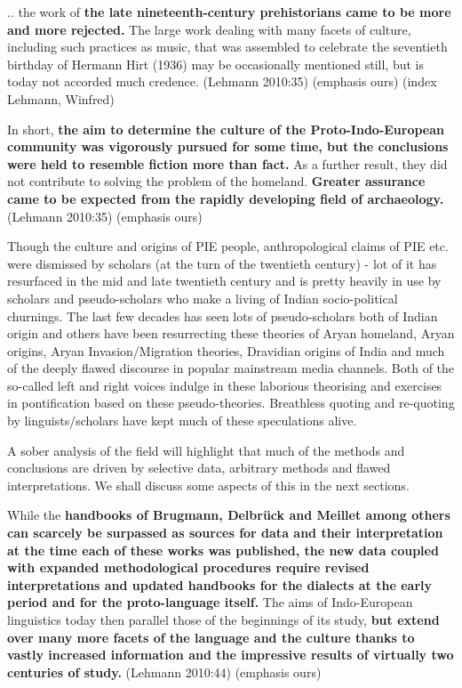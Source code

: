 \begin{myquote}
.. the work of \textbf{the late nineteenth-century prehistorians came to be more and more rejected.} The large work dealing with many facets of culture, including such practices as music, that was assembled to celebrate the seventieth birthday of Hermann Hirt (1936) may be occasionally mentioned still, but is today not accorded much credence. (Lehmann 2010:35) (emphasis ours) (index Lehmann, Winfred)
\end{myquote}

\begin{myquote}
In short, \textbf{the aim to determine the culture of the Proto-Indo-European community was vigorously pursued for some time, but the conclusions were held to resemble fiction more than fact.} As a further result, they did not contribute to solving the problem of the homeland. \textbf{Greater assurance came to be expected from the rapidly developing field of archaeology.} (Lehmann 2010:35) (emphasis ours)
\end{myquote}

Though the culture and origins of PIE people, anthropological claims of PIE etc. were dismissed by scholars (at the turn of the twentieth century) - lot of it has resurfaced in the mid and late twentieth century and is pretty heavily in use by scholars and pseudo-scholars who make a living of Indian socio-political churnings. The last few decades has seen lots of pseudo-scholars both of Indian origin and others have been resurrecting these theories of Aryan homeland, Aryan origins, Aryan Invasion/Migration theories, Dravidian origins of India and much of the deeply flawed discourse in popular mainstream media channels. Both of the so-called left and right voices indulge in these laborious theorising and exercises in pontification based on these pseudo-theories. Breathless quoting and re-quoting by linguists/scholars have kept much of these speculations alive.

A sober analysis of the field will highlight that much of the methods and conclusions are driven by selective data, arbitrary methods and flawed interpretations. We shall discuss some aspects of this in the next sections.

\begin{myquote}
While the \textbf{handbooks of Brugmann, Delbrück and Meillet among others can scarcely be surpassed as sources for data and their interpretation at the time each of these works was published, the new data coupled with expanded methodological procedures require revised interpretations and updated handbooks for the dialects at the early period and for the proto-language itself.} The aims of Indo-European linguistics today then parallel those of the beginnings of its study, \textbf{but extend over many more facets of the language and the culture thanks to vastly increased information and the impressive results of virtually two centuries of study.} (Lehmann 2010:44) (emphasis ours)
\end{myquote}


